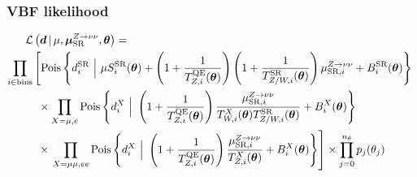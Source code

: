 \documentclass[aspectratio=169,xcolor=dvipsnames,,table,compress]{beamer}
\begin{document}
\begin{frame} \frametitle{VBF likelihood}
\vspace{-5mm}
\begin{align*}
    \mathcal{L}\left(\bm{d}\,|\, \mu,\muz,\bm{\theta}\right) = \hspace{-30mm} & \nonumber \\
    \prod_{i\in\mathrm{bins}} & \left[
    \pois\left\{d^{\mathrm{SR}}_{i} ~\Big|~ \mu S^{\mathrm{SR}}_{i}(\bm\theta)  + \left(1+\frac{1}{\Ti{\mathrm{QE}}{Z}(\bm\theta)}\right)\left(1+\frac{1}{\Ti{\mathrm{SR}}{Z/W}(\bm\theta)}\right)\muzi + B^{\mathrm{SR}}_{i}(\bm\theta)\right\} \vphantom{\frac{\muzi}{\Ti{\mu\mu}{Z}(\bm\theta)}}\right. \nonumber \\
    & \phantom{\Big[} \times \prod_{X=\mu,e} \pois\left\{d^{X}_i~\Big|~ \left(1+\frac{1}{\Ti{\mathrm{QE}}{Z}(\bm\theta)}\right)\frac{\muzi}{\Ti{X}{W}(\bm\theta)\Ti{\mathrm{SR}}{Z/W}(\bm\theta)} + B^{X}_i(\bm\theta) \right\} \nonumber \\
    & \phantom{\Big[} \times \left.\prod_{X=\mu\mu,ee} \pois\left\{d^{X}_i~\Big|~ \left(1+\frac{1}{\Ti{\mathrm{QE}}{Z}(\bm\theta)}\right)\frac{\muzi}{\Ti{X}{Z}(\bm\theta)} + B^{X}_i(\bm\theta) \right\} \right]  \times  \prod_{j=0}^{n_\theta} p_j(\theta_j)
\end{align*}
\end{frame}
\end{document}
